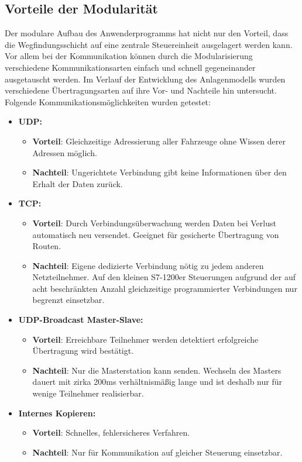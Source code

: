 	\subsection{Vorteile der Modularität}
		
		Der modulare Aufbau des Anwenderprogramms hat nicht nur den Vorteil, dass die Wegfindungsschicht auf eine zentrale Steuereinheit ausgelagert werden kann. Vor allem bei der Kommunikation können durch die Modularisierung verschiedene Kommunikationsarten einfach und schnell gegeneinander ausgetauscht werden. Im Verlauf der Entwicklung des Anlagenmodells wurden verschiedene Übertragungsarten auf ihre Vor- und Nachteile hin untersucht.
		Folgende Kommunikationsmöglichkeiten wurden getestet:
		
		\begin{itemize}
			\item \textbf{\ac{UDP}:} 
				\begin{itemize}
					\item \textbf{Vorteil}: Gleichzeitige Adressierung aller Fahrzeuge ohne Wissen derer Adressen möglich.
					\item \textbf{Nachteil}: Ungerichtete Verbindung gibt keine Informationen über den Erhalt der Daten zurück.
				\end{itemize}
			\item \textbf{\acs{TCP}:}
				\begin{itemize}
					\item \textbf{Vorteil}: Durch Verbindungsüberwachung werden Daten bei Verlust automatisch neu versendet. Geeignet für gesicherte Übertragung von Routen.
					\item \textbf{Nachteil}: Eigene dedizierte Verbindung nötig zu jedem anderen Netzteilnehmer. Auf den kleinen S7-1200er Steuerungen aufgrund der auf acht beschränkten Anzahl gleichzeitige programmierter Verbindungen\cite{S7-1200} nur begrenzt einsetzbar.
				\end{itemize}
			\item \textbf{\ac{UDP}-Broadcast Master-Slave:}
				\begin{itemize}
					\item \textbf{Vorteil}: Erreichbare Teilnehmer werden detektiert erfolgreiche Übertragung wird bestätigt.
					\item \textbf{Nachteil}: Nur die Masterstation kann senden. Wechseln des Masters dauert mit zirka 200ms verhältnismäßig lange und ist deshalb nur für wenige Teilnehmer realisierbar. 
				\end{itemize}
			\item \textbf{Internes Kopieren:}
			\begin{itemize}
				\item \textbf{Vorteil}: Schnelles, fehlersicheres Verfahren.
				\item \textbf{Nachteil}: Nur für Kommunikation auf gleicher Steuerung einsetzbar.
			\end{itemize}
		\end{itemize}
		
